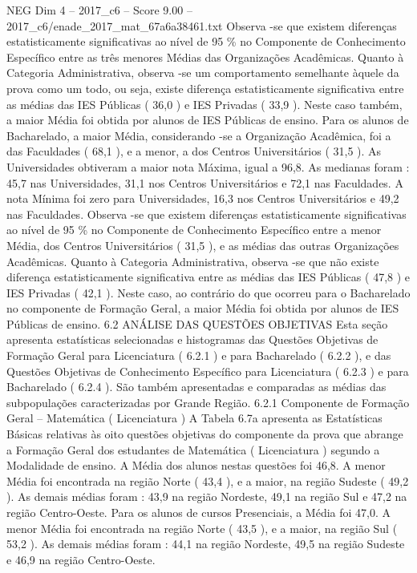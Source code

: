 \begin{textsample}{NEG Dim 4 – 2017\_c6 – Score 9.00 – 2017\_c6/enade\_2017\_mat\_67a6a38461.txt}
Observa -se que existem diferenças estatisticamente significativas ao nível de 95 \% no Componente de Conhecimento Específico entre as três menores Médias das Organizações Acadêmicas.
Quanto à Categoria Administrativa, observa -se um comportamento semelhante àquele da prova como um todo, ou seja, existe diferença estatisticamente significativa entre as médias das IES Públicas ( 36,0 ) e IES Privadas ( 33,9 ).
Neste caso também, a maior Média foi obtida por alunos de IES Públicas de ensino.
Para os alunos de Bacharelado, a maior Média, considerando -se a Organização Acadêmica, foi a das Faculdades ( 68,1 ), e a menor, a dos Centros Universitários ( 31,5 ).
As Universidades obtiveram a maior nota Máxima, igual a 96,8.
As medianas foram : 45,7 nas Universidades, 31,1 nos Centros Universitários e 72,1 nas Faculdades.
A nota Mínima foi zero para Universidades, 16,3 nos Centros Universitários e 49,2 nas Faculdades.
Observa -se que existem diferenças estatisticamente significativas ao nível de 95 \% no Componente de Conhecimento Específico entre a menor Média, dos Centros Universitários ( 31,5 ), e as médias das outras Organizações Acadêmicas.
Quanto à Categoria Administrativa, observa -se que não existe diferença estatisticamente significativa entre as médias das IES Públicas ( 47,8 ) e IES Privadas ( 42,1 ).
Neste caso, ao contrário do que ocorreu para o Bacharelado no componente de Formação Geral, a maior Média foi obtida por alunos de IES Públicas de ensino. 6.2 ANÁLISE DAS QUESTÕES OBJETIVAS Esta seção apresenta estatísticas selecionadas e histogramas das Questões Objetivas de Formação Geral para Licenciatura ( 6.2.1 ) e para Bacharelado ( 6.2.2 ), e das Questões Objetivas de Conhecimento Específico para Licenciatura ( 6.2.3 ) e para Bacharelado ( 6.2.4 ).
São também apresentadas e comparadas as médias das subpopulações caracterizadas por Grande Região. 6.2.1 Componente de Formação Geral – Matemática ( Licenciatura ) A Tabela 6.7a apresenta as Estatísticas Básicas relativas às oito questões objetivas do componente da prova que abrange a Formação Geral dos estudantes de Matemática ( Licenciatura ) segundo a Modalidade de ensino.
A Média dos alunos nestas questões foi 46,8.
A menor Média foi encontrada na região Norte ( 43,4 ), e a maior, na região Sudeste ( 49,2 ).
As demais médias foram : 43,9 na região Nordeste, 49,1 na região Sul e 47,2 na região Centro-Oeste.
Para os alunos de cursos Presenciais, a Média foi 47,0.
A menor Média foi encontrada na região Norte ( 43,5 ), e a maior, na região Sul ( 53,2 ).
As demais médias foram : 44,1 na região Nordeste, 49,5 na região Sudeste e 46,9 na região Centro-Oeste.

\end{textsample}
